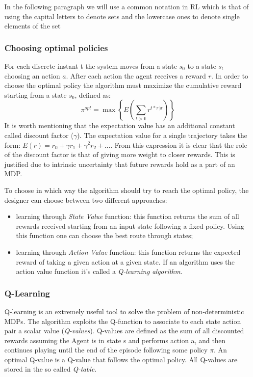 In the following paragraph we will use a common notation in RL which is that of using the capital letters to denote sets and the lowercase ones to denote single elements of the set

\subsubsection{Choosing optimal policies}

For each discrete instant t the system moves from a state $s_{0}$ to a state $s_{1}$ choosing an action $a$.
After each action the agent receives a reward $r$. 
In order to choose the optimal policy the algorithm must maximize the cumulative reward starting from a state $s_{0}$, defined as: 
\begin{equation}
\pi^{opt} = \max\left\{E\left(\sum_{t>0}r^{t*r|\pi}\right)\right\}
\end{equation}
It is worth mentioning that the expectation value has an additional constant called discount factor ($\gamma$).
The expectation value for a single trajectory takes the form: $E(r) = r_{0} + \gamma r_{1} + \gamma^{2} r_{2} + \ldots$.
From this expression it is clear that the role of the discount factor is that of giving more weight to closer rewards.
This is justified due to intrinsic uncertainty that future rewards hold as a part of an MDP.

To choose in which way the algorithm should try to reach the optimal policy, the designer can choose between two different approaches:

\begin{itemize}
    \item learning through \emph{State Value} function: this function returns the sum of all rewards received starting from an input state following a fixed policy.
        Using this function one can choose the best route through states;
    \item learning through \emph{Action Value} function: this function returns the expected reward of taking a given action at a given state.
        If an algorithm uses the action value function it's called a \emph{Q-learning algorithm}.    
\end{itemize}

\subsubsection{Q-Learning} \label{Qlearning}

Q-learning is an extremely useful tool to solve the problem of non-deterministic MDPs.
The algorithm exploits the Q-function to associate to each state action pair a scalar value (\emph{Q-values}).
Q-values are defined as the sum of all discounted rewards assuming the Agent is in state s and performs action a, and then continues playing until the end of the episode following some policy $\pi$.
An optimal Q-value is a Q-value that follows the optimal policy. All Q-values are stored in the so called \emph{Q-table}.

